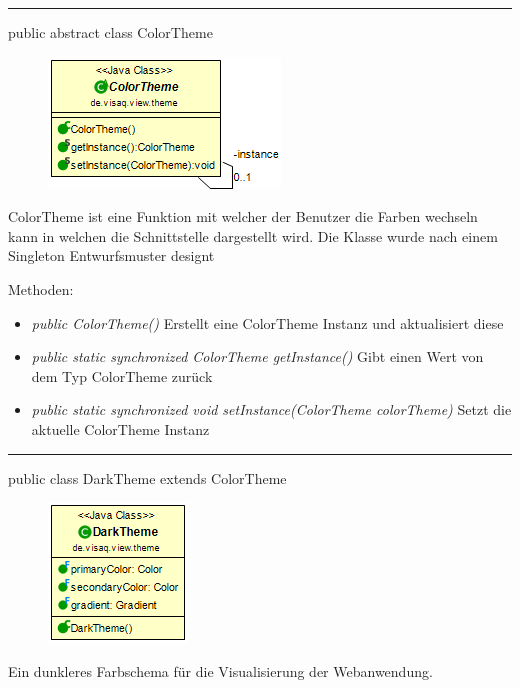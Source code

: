 

\rule{\textwidth}{0.4pt}
public abstract class ColorTheme

\begin{minipage}{0.3\textwidth}
    \begin{figure}[H]
        \includegraphics[scale = 0.5]{media/frontend/view/de.view.elements.theme/ColorTheme_Class.png}
    \end{figure}
    \end{minipage} \hfill
    \begin{minipage}{0.6\textwidth}
ColorTheme ist eine Funktion mit welcher der Benutzer die Farben wechseln kann in welchen die Schnittstelle dargestellt wird. Die Klasse wurde nach einem Singleton Entwurfsmuster designt
\end{minipage} 

Methoden:
\begin{itemize} 
    \item \emph{public ColorTheme()} Erstellt eine ColorTheme Instanz und aktualisiert diese
    \item \emph{public static synchronized ColorTheme getInstance()} Gibt einen Wert von dem Typ ColorTheme zurück
    \item \emph{public static synchronized void setInstance(ColorTheme colorTheme)} Setzt die aktuelle ColorTheme Instanz
\end{itemize}

\rule{\textwidth}{0.4pt}
public class DarkTheme extends ColorTheme

\begin{minipage}{0.3\textwidth}
    \begin{figure}[H]
        \includegraphics[scale = 0.5]{media/frontend/view/de.view.elements.theme/DarkTheme_Class.png}
    \end{figure}
    \end{minipage} \hfill
    \begin{minipage}{0.6\textwidth}
       Ein dunkleres Farbschema für die Visualisierung der Webanwendung.
    \end{minipage}

